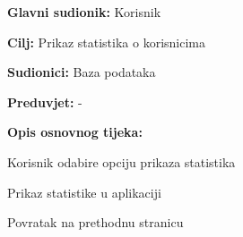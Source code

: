 	
			\noindent {}
			\begin{packed_item}
				
				\item \textbf{Glavni sudionik: }Korisnik
				\item  \textbf{Cilj:} Prikaz statistika o korisnicima 
				\item  \textbf{Sudionici:} Baza podataka
				\item  \textbf{Preduvjet:} -
				\item  \textbf{Opis osnovnog tijeka:}
				
				\item[] \begin{packed_enum}
					
					\item Korisnik odabire opciju prikaza statistika
					\item Prikaz statistike u aplikaciji
					\item Povratak na prethodnu stranicu
			
				\end{packed_enum}
				
				
				
			\end{packed_item}
		
